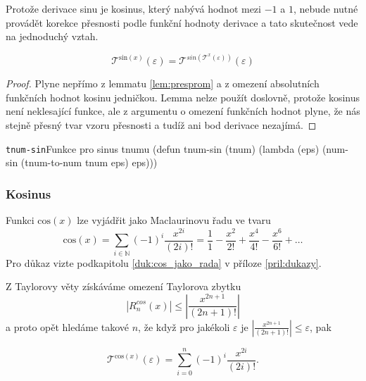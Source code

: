 Protože derivace sinu je kosinus, který nabývá hodnot mezi $-1$ a $1$, nebude nutné provádět korekce přesnosti podle funkční hodnoty derivace a tato skutečnost vede na jednoduchý vztah.

\begin{lemma}
\begin{equation}
\mathcal{T}^{\mathrm{sin}(x)}(\varepsilon)=\mathcal{T}^{sin(\mathcal{T}^x(\varepsilon))}(\varepsilon)
\end{equation}
\begin{proof}
Plyne nepřímo z lemmatu \ref{lem:presprom} a z omezení absolutních funkčních hodnot kosinu jedničkou. Lemma nelze použít doslovně, protože kosinus není neklesající funkce, ale z argumentu o omezení funkčních hodnot plyne, že nás stejně přesný tvar vzoru přesnosti a tudíž ani bod derivace nezajímá.
\end{proof}
\end{lemma}

\begin{lispcode}{\texttt{tnum-sin}}{Funkce pro sinus tnumu}
(\textcolor{funkcionalni}{defun} \textcolor{pojmenovan}{tnum-sin} (tnum)
  (\textcolor{funkcionalni}{lambda} (eps)
    (\textcolor{moje}{num-sin} (\textcolor{moje}{tnum-to-num} tnum eps) eps)))
\end{lispcode}

\subsubsection{Kosinus}
\begin{fact}\label{vet:cos_jako_rada}
Funkci $\mathrm{cos}(x)$ lze vyjádřit jako Maclaurinovu řadu ve tvaru
\begin{equation}
\mathrm{cos}(x) = \sum_{i\in\mathbb{N}}(-1)^i \frac{x^{2i}}{(2i)!} = \frac{1}{1} - \frac{x^2}{2!} + \frac{x^4}{4!} - \frac{x^6}{6!} + \ldots
\end{equation}
Pro důkaz vizte podkapitolu \ref{duk:cos_jako_rada} v příloze \ref{pril:dukazy}.
\end{fact}

Z Taylorovy věty získáváme omezení Taylorova zbytku
\begin{equation}
|R^{cos}_n(x)|\leq\left|\frac{x^{2n+1}}{(2n+1)!}\right|
\end{equation}
a proto opět hledáme takové $n$, že když pro jakékoli $\varepsilon$ je $|\frac{x^{2n+1}}{(2n+1)!}|\leq\varepsilon$, pak 
\begin{consequence}
\begin{equation}
\mathcal{T}^{\mathrm{cos}(x)}(\varepsilon)=\sum_{i=0}^n(-1)^i \frac{x^{2i}}{(2i)!}.
\end{equation}
\end{consequence}

